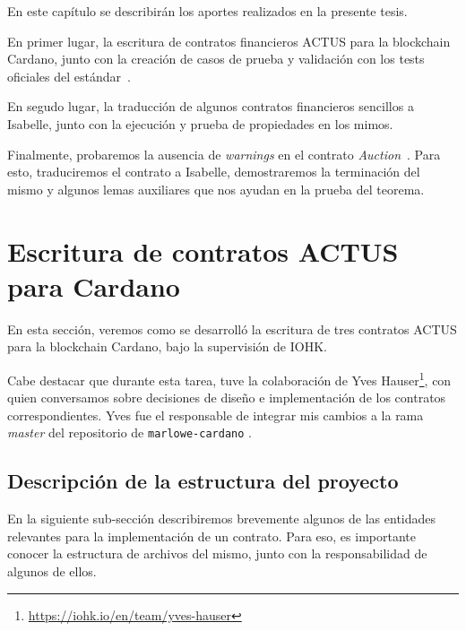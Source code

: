 \documentclass[12pt]{book}
\begin{document}
En este capítulo se describirán los aportes realizados en la presente tesis. 

En primer lugar, la escritura de contratos financieros ACTUS para la blockchain Cardano, junto con la creación de casos de prueba y validación con los tests oficiales del estándar~\cite{ACTUS_Tests}.

En segudo lugar, la traducción de algunos contratos financieros sencillos a Isabelle, junto con la ejecución y prueba de propiedades en los mimos.

Finalmente, probaremos la ausencia de \textit{warnings} en el contrato \textit{Auction}~\cite{auction_haskell}. Para esto, traduciremos el contrato a Isabelle, demostraremos la terminación del mismo y algunos lemas auxiliares que nos ayudan en la prueba del teorema.

\section{Escritura de contratos ACTUS para Cardano}

En esta sección, veremos como se desarrolló la escritura de tres contratos ACTUS para la blockchain Cardano, bajo la supervisión de IOHK.\@

Cabe destacar que durante esta tarea, tuve la colaboración de Yves Hauser\footnote{\url{https://iohk.io/en/team/yves-hauser}}, con quien conversamos sobre decisiones de diseño e implementación de los contratos correspondientes. Yves fue el responsable de integrar mis cambios a la rama \textit{master} del repositorio de \texttt{marlowe-cardano} \cite{marlowe-cardano-github}. %

\newpage
\subsection{Descripción de la estructura del proyecto}\label{sec:estructura}

En la siguiente sub-sección describiremos brevemente algunos de las entidades relevantes para la implementación de un contrato. Para eso, es importante conocer la estructura de archivos del mismo, junto con la responsabilidad de algunos de ellos.
\end{document}
